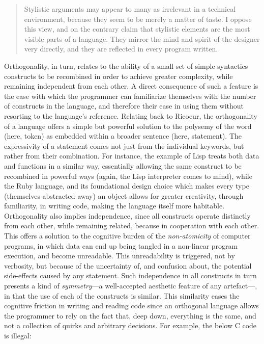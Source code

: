 \begin{quote}
  Stylistic arguments may appear to many as irrelevant in a technical environment, because they seem to be merely a matter of taste. I oppose this view, and on the contrary claim that stylistic elements are the most visible parts of a language. They mirror the mind and spirit of the designer very directly, and they are reflected in every program written. \citep{wirth_essence_2003}
\end{quote}

Orthogonality, in turn, relates to the ability of a small set of simple syntactics constructs to be recombined in order to achieve greater complexity, while remaining independent from each other. A direct consequence of such a feature is the ease with which the programmer can familiarize themselves with the number of constructs in the language, and therefore their ease in using them without resorting to the language's reference. Relating back to Ricoeur, the orthogonality of a language offers a simple but powerful solution to the polysemy of the word (here, token) as embedded within a broader sentence (here, statement). The expressivity of a statement comes not just from the individual keywords, but rather from their combination. For instance, the example of Lisp treats both data and functions in a similar way, essentially allowing the same construct to be recombined in powerful ways (again, the Lisp interpreter comes to mind), while the Ruby language, and its foundational design choice which makes every type (themselves abstracted away) an object allows for greater creativity, through familiarity, in writing code, making the language itself more habitable. Orthogonality also implies independence, since all constructs operate distinctly from each other, while remaining related, because in cooperation with each other. This offers a solution to the cognitive burden of the \emph{non-atomicity} of computer programs, in which data can end up being tangled in a non-linear program execution, and become unreadable. This unreadability is triggered, not by verbosity, but because of the uncertainty of, and confusion about, the potential side-effects caused by any statement. Such independence in all constructs in turn presents a kind of \emph{symmetry}—a well-accepted aesthetic feature of any artefact—, in that the use of each of the constructs is similar. This similarity eases the cognitive friction in writing and reading code since an orthogonal language allows the programmer to rely on the fact that, deep down, everything is the same, and not a collection of quirks and arbitrary decisions. For example, the below C code is illegal:

